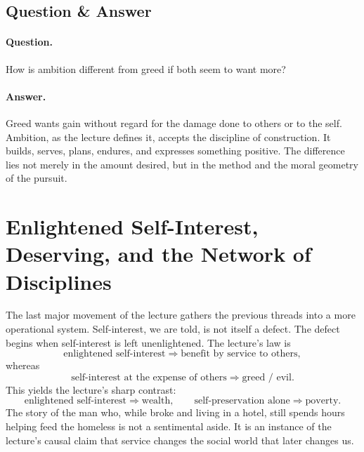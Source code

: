 \subsection{Question \& Answer}

\paragraph{Question.} How is ambition different from greed if both seem to want more?

\paragraph{Answer.} Greed wants gain without regard for the damage done to others or to the self. Ambition, as the lecture defines it, accepts the discipline of construction. It builds, serves, plans, endures, and expresses something positive. The difference lies not merely in the amount desired, but in the method and the moral geometry of the pursuit.

\section{Enlightened Self-Interest, Deserving, and the Network of Disciplines}

The last major movement of the lecture gathers the previous threads into a more operational system. Self-interest, we are told, is not itself a defect. The defect begins when self-interest is left unenlightened. The lecture's law is
\begin{equation}
\text{enlightened self-interest}\Rightarrow \text{benefit by service to others},
\end{equation}
whereas
\begin{equation}
\text{self-interest at the expense of others}\Rightarrow \text{greed / evil}.
\end{equation}
This yields the lecture's sharp contrast:
\begin{equation}
\text{enlightened self-interest}\Rightarrow \text{wealth},
\qquad
\text{self-preservation alone}\Rightarrow \text{poverty}.
\end{equation}
The story of the man who, while broke and living in a hotel, still spends hours helping feed the homeless is not a sentimental aside. It is an instance of the lecture's causal claim that service changes the social world that later changes us.

